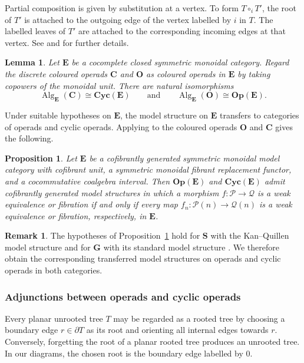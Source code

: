 \documentclass{amsart}
\newcommand{\bE}{\mathbf{E}}
\newcommand{\sSet}{\mathbf{S}}
\newcommand{\Grpd}{\mathbf{G}}
\newcommand{\Cyc}{\mathbf{Cyc}}
\newcommand{\Op}{\mathbf{Op}}
\newcommand{\Alg}{\operatorname{Alg}}
\newtheorem{prop}[theorem]{Proposition}%
\newtheorem{lemma}[theorem]{Lemma}%
\theoremstyle{definition}
\newtheorem{remark}[theorem]{Remark}%
\numberwithin{equation}{section}
\begin{document}
Partial composition is given by substitution at a vertex. To form
$T\circ_iT'$, the root of $T'$ is attached to the outgoing edge of
the vertex labelled by $i$ in $T$. The labelled leaves of $T'$ are
attached to the corresponding incoming edges at that vertex. See
\cite[Example~1.5.6]{bm_resolutions} and
\cite[Definition~2.9]{cacti} for further details.

\begin{lemma}
\label{lemma: cyclic operads are algebras over operads}
Let $\bE$ be a cocomplete closed symmetric monoidal category. Regard
the discrete coloured operads $\mathbf C$ and $\mathbf O$ as coloured
operads in $\bE$ by taking copowers of the monoidal unit. There are
natural isomorphisms
\[
\Alg_{\bE}(\mathbf C)\cong\Cyc(\bE)
\qquad\text{and}\qquad
\Alg_{\bE}(\mathbf O)\cong\Op(\bE).
\]
\end{lemma}

Under suitable hypotheses on $\bE$, the model structure on $\bE$
transfers to categories of operads and cyclic operads. Applying
\cite[Theorem~2.1]{bm_resolutions} to the coloured operads
$\mathbf O$ and $\mathbf C$ gives the following.

\begin{prop}
\label{model category on alg over operad}
Let $\bE$ be a cofibrantly generated symmetric monoidal model
category with cofibrant unit, a symmetric monoidal fibrant
replacement functor, and a cocommutative coalgebra interval. Then
$\Op(\bE)$ and $\Cyc(\bE)$ admit cofibrantly generated model
structures in which a morphism
$f\colon\mathcal P\to\mathcal Q$ is a weak equivalence or fibration
if and only if every map
$f_n\colon\mathcal P(n)\to\mathcal Q(n)$ is a weak equivalence or
fibration, respectively, in $\bE$.
\end{prop}

\begin{remark}
The hypotheses of
Proposition~\ref{model category on alg over operad} hold for
$\sSet$ with the Kan--Quillen model structure and for $\Grpd$ with
its standard model structure \cite{And}. We therefore obtain the
corresponding transferred model structures on operads and cyclic
operads in both categories.
\end{remark}

\subsubsection{Adjunctions between operads and cyclic operads}

Every planar unrooted tree $T$ may be regarded as a rooted tree by
choosing a boundary edge $r\in\partial T$ as its root and orienting
all internal edges towards $r$. Conversely, forgetting the root of a
planar rooted tree produces an unrooted tree. In our diagrams, the
chosen root is the boundary edge labelled by $0$.
\end{document}
